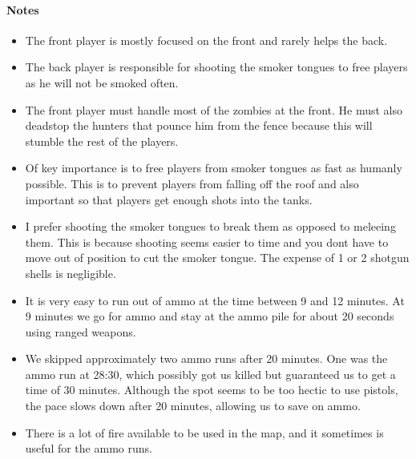 \paragraph{Notes}
\begin{itemize}
\item The front player is mostly focused on the front and rarely helps the back.
\item The back player is responsible for shooting the smoker tongues to free players as he will not be smoked often.
\item The front player must handle most of the zombies at the front. He must also deadstop the hunters that pounce him from the fence because this will stumble the rest of the players.
\item Of key importance is to free players from smoker tongues as fast as humanly possible. This is to prevent players from falling off the roof and also important so that players get enough shots into the tanks.
\item I prefer shooting the smoker tongues to break them as opposed to meleeing them. This is because shooting seems easier to time and you dont have to move out of position to cut the smoker tongue. The expense of 1 or 2 shotgun shells is negligible.
\item It is very easy to run out of ammo at the time between 9 and 12 minutes. At 9 minutes we go for ammo and stay at the ammo pile for about 20 seconds using ranged weapons.
\item We skipped approximately two ammo runs after 20 minutes. One was the ammo run at 28:30, which possibly got us killed but guaranteed us to get a time of 30 minutes. Although the spot seems to be too hectic to use pistols, the pace slows down after 20 minutes, allowing us to save on ammo.
\item There is a lot of fire available to be used in the map, and it sometimes is useful for the ammo runs.
\end{itemize}
